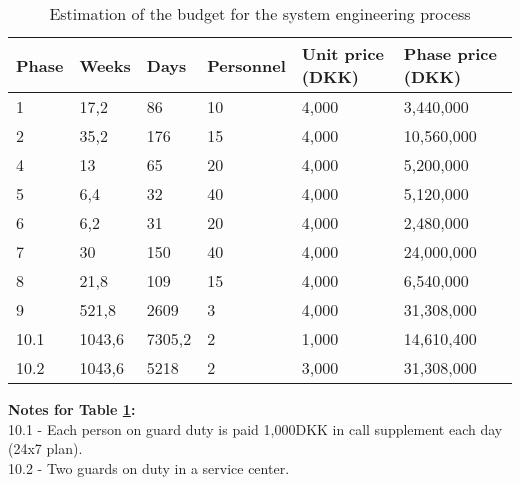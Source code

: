 \begin{table}[H]
\centering
\begin{tabular}{|l|lllll|}
\hline
\textbf{Phase} & \multicolumn{1}{c}{\textbf{Weeks}} & \textbf{Days} & \textbf{Personnel} & \textbf{Unit price (DKK)} & \textbf{Phase price (DKK)} \\ \hline
1              & 17,2                               & 86            & 10                 & 4,000                     & 3,440,000                  \\
2              & 35,2                               & 176           & 15                 & 4,000                     & 10,560,000                 \\
4              & 13                                 & 65            & 20                 & 4,000                     & 5,200,000                  \\
5              & 6,4                                & 32            & 40                 & 4,000                     & 5,120,000                  \\
6              & 6,2                                & 31            & 20                 & 4,000                     & 2,480,000                  \\
7              & 30                                 & 150           & 40                 & 4,000                     & 24,000,000                 \\
8              & 21,8                               & 109           & 15                 & 4,000                     & 6,540,000                  \\
9              & 521,8                              & 2609          & 3                  & 4,000                     & 31,308,000                 \\
10.1           & 1043,6                             & 7305,2        & 2                  & 1,000                     & 14,610,400                 \\
10.2           & 1043,6                             & 5218          & 2                  & 3,000                     & 31,308,000                 \\ \hline
\end{tabular}
\caption{Estimation of the budget for the system engineering process}
\label{tab:BudgetEstimation}
\end{table}

\textbf{Notes for Table \ref{tab:BudgetEstimation}:} \\
10.1 - Each person on guard duty is paid 1,000DKK in call supplement each day (24x7 plan). \\
10.2 - Two guards on duty in a service center.

